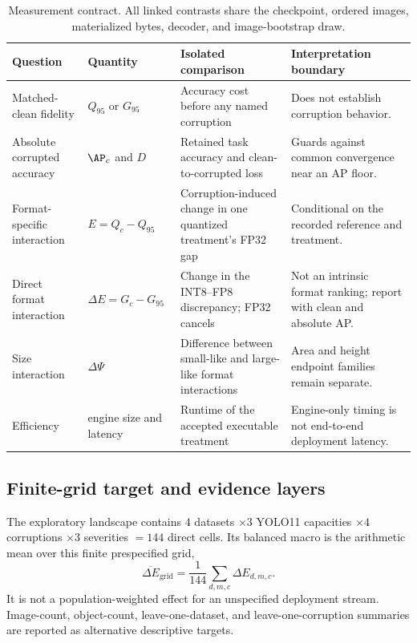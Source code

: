 \begin{table}[t]
\centering
\caption{Measurement contract. All linked contrasts share the checkpoint,
ordered images, materialized bytes, decoder, and image-bootstrap draw.}
\label{tab:measurement-contract}
\small
\setlength{\tabcolsep}{4pt}
\begin{tabular}{Y{2.45cm}Y{2.7cm}Y{4.65cm}Y{4.35cm}}
\toprule
Question & Quantity & Isolated comparison & Interpretation boundary \\
\midrule
Matched-clean fidelity & $Q_{95}$ or $G_{95}$ & Accuracy cost before any named corruption & Does not establish corruption behavior. \\
Absolute corrupted accuracy & $\AP_c$ and $D$ & Retained task accuracy and clean-to-corrupted loss & Guards against common convergence near an AP floor. \\
Format-specific interaction & $E=Q_c-Q_{95}$ & Corruption-induced change in one quantized treatment's FP32 gap & Conditional on the recorded reference and treatment. \\
Direct format interaction & $\Delta E=G_c-G_{95}$ & Change in the INT8--FP8 discrepancy; FP32 cancels & Not an intrinsic format ranking; report with clean and absolute AP. \\
Size interaction & $\Delta\Psi$ & Difference between small-like and large-like format interactions & Area and height endpoint families remain separate. \\
Efficiency & engine size and latency & Runtime of the accepted executable treatment & Engine-only timing is not end-to-end deployment latency. \\
\bottomrule
\end{tabular}
\end{table}

\subsection{Finite-grid target and evidence layers}
\label{sec:evidence-layers}

The exploratory landscape contains
$4$ datasets $\times3$ YOLO11 capacities $\times4$ corruptions $\times3$
severities $=144$ direct cells. Its balanced macro is the arithmetic mean over
this finite prespecified grid,
\begin{equation}
\overline{\Delta E}_{\mathrm{grid}}=
\frac{1}{144}\sum_{d,m,c}\Delta E_{d,m,c}.
\end{equation}
It is not a population-weighted effect for an unspecified deployment stream.
Image-count, object-count, leave-one-dataset, and leave-one-corruption summaries
are reported as alternative descriptive targets.

